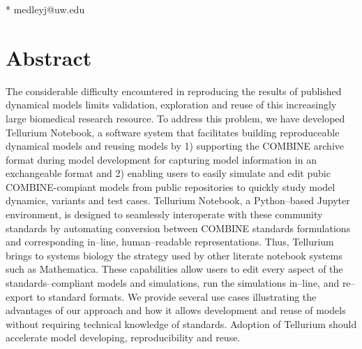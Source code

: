 \documentclass[10pt,letterpaper]{article}
\begin{document}
\begin{flushleft}


* medleyj@uw.edu

\end{flushleft}
%
%
\section*{Abstract}
The considerable difficulty encountered in reproducing the results of published dynamical models limits validation, exploration and reuse of this increasingly large biomedical research resource.   %
To address this problem, we have developed Tellurium Notebook, a software system that facilitates building reproduceable dynamical models and reusing models by 1) supporting the COMBINE archive format during model development for capturing model information in an exchangeable format and 2) enabling users to easily simulate and edit pubic COMBINE-compiant models from public repositories to quickly study model dynamics, variants and test cases. Tellurium Notebook, a Python--based Jupyter environment, is designed to seamlessly interoperate with these community standards by automating conversion between COMBINE standards formulations and corresponding in--line, human--readable representations. Thus, Tellurium brings to systems biology the strategy used by other literate notebook systems such as Mathematica. These capabilities allow users to edit every aspect of the standards--compliant models and simulations, run the simulations in--line, and re--export to standard formats. We provide several use cases illustrating the advantages of our approach and how it  allows development and reuse of models without requiring technical knowledge of standards. Adoption of Tellurium should accelerate model developing, reproducibility and reuse.  
\end{document}
